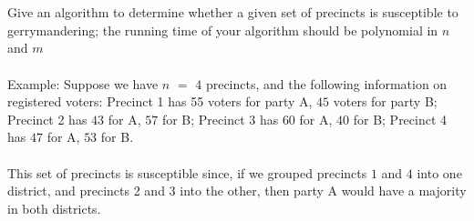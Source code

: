 \documentclass[12pt]{article}
\def\blankpage{%
      \clearpage%
      \thispagestyle{empty}%
      \addtocounter{page}{-1}%
      \null%
      \clearpage}
\begin{document}
\\\\
Give an algorithm to determine whether a given set of precincts is susceptible to gerrymandering;
the running time of your algorithm should be polynomial in $n$ and $m$
\\\\
Example: Suppose we have $n$ $=$ $4$ precincts, and the following information on registered
voters: Precinct 1 has 55 voters for party A, $45$ voters for party B; Precinct 2 has $43$ for A,
$57$ for B; Precinct 3 has $60$ for A, $40$ for B; Precinct 4 has $47$ for A, $53$ for B.
\\\\
This set of precincts is susceptible since, if we grouped precincts $1$ and $4$ into one district,
and precincts 2 and 3 into the other, then party A would have a majority in both districts.
\blankpage
\end{document}
